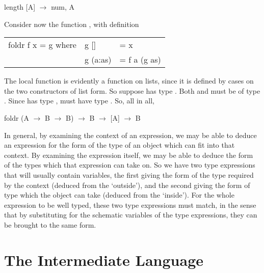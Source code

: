 \begin{mlcoded}
    length \hastype{} [A] $\rightarrow$ num,  A
\end{mlcoded}
Consider now the function , with definition
\begin{mlcoded}
    \begin{tabular}{lll}
    foldr f x = g where &g [] &= x \\
        &g (a:as) &= f a (g as)
    \end{tabular}
\end{mlcoded}
The local function  is evidently a function on lists, since it is defined by cases
on the two constructors of list form. So suppose  has type .
Both  and  must be of type . Since  has type ,  must
have type . So, all in all,
\begin{mlcoded}
    foldr \hastype{} (A $\rightarrow$ B $\rightarrow$ B) $\rightarrow$ B $\rightarrow$ [A] $\rightarrow$ B
\end{mlcoded}

In general, by examining the context of an expression, we may be able to
deduce an expression for the form of the type of an object which can fit into
that context. By examining the expression itself, we may be able to deduce the
form of the types which that expression can take on. So we have two type
expressions that will usually contain variables, the first giving the form of the
type required by the context (deduced from the `outside'), and the second
giving the form of type which the object can take (deduced from the `inside').
For the whole expression to be well typed, these two type expressions must
match, in the sense that by substituting for the schematic variables of the type
expressions, they can be brought to the same form.

\section{The Intermediate Language}

